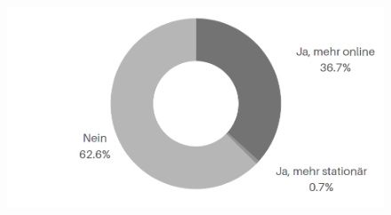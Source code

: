 \begin{figure}[H]
    \begin{center}
        \includegraphics[width=12cm]{media/schuelerumfrage/14.png}
    \end{center}
\end{figure}

\newpage









